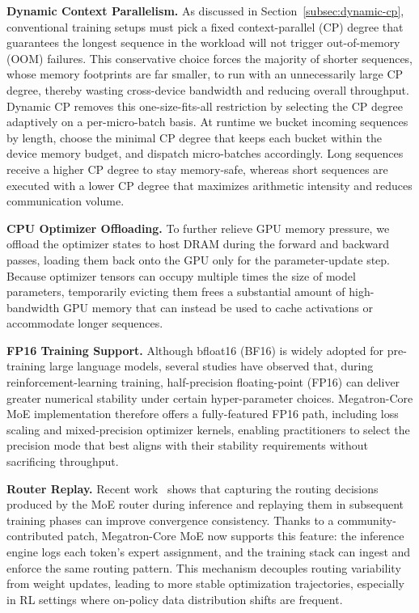 \textbf{Dynamic Context Parallelism.} As discussed in Section~\ref{subsec:dynamic-cp}, conventional training setups must pick a fixed context-parallel (CP) degree that guarantees the longest sequence in the workload will not trigger out-of-memory (OOM) failures. This conservative choice forces the majority of shorter sequences, whose memory footprints are far smaller, to run with an unnecessarily large CP degree, thereby wasting cross-device bandwidth and reducing overall throughput.
Dynamic CP removes this one-size-fits-all restriction by selecting the CP degree adaptively on a per-micro-batch basis. At runtime we bucket incoming sequences by length, choose the minimal CP degree that keeps each bucket within the device memory budget, and dispatch micro-batches accordingly. Long sequences receive a higher CP degree to stay memory-safe, whereas short sequences are executed with a lower CP degree that maximizes arithmetic intensity and reduces communication volume.

\textbf{CPU Optimizer Offloading.} To further relieve GPU memory pressure, we offload the optimizer states to host DRAM during the forward and backward passes, loading them back onto the GPU only for the parameter-update step. Because optimizer tensors can occupy multiple times the size of model parameters, temporarily evicting them frees a substantial amount of high-bandwidth GPU memory that can instead be used to cache activations or accommodate longer sequences.

\textbf{FP16 Training Support.} Although bfloat16 (BF16) is widely adopted for pre-training large language models, several studies have observed that, during reinforcement-learning training, half-precision floating-point (FP16) can deliver greater numerical stability under certain hyper-parameter choices. Megatron-Core MoE implementation therefore offers a fully-featured FP16 path, including loss scaling and mixed-precision optimizer kernels, enabling practitioners to select the precision mode that best aligns with their stability requirements without sacrificing throughput.

\textbf{Router Replay.} Recent work~\cite{fan2025routerreplay} shows that capturing the routing decisions produced by the MoE router during inference and replaying them in subsequent training phases can improve convergence consistency. Thanks to a community-contributed patch, Megatron-Core MoE now supports this feature: the inference engine logs each token's expert assignment, and the training stack can ingest and enforce the same routing pattern. This mechanism decouples routing variability from weight updates, leading to more stable optimization trajectories, especially in RL settings where on-policy data distribution shifts are frequent.


